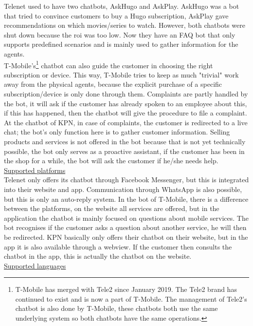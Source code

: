 \break
Telenet used to have two chatbots, AskHugo and AskPlay. AskHugo was a bot that tried to convince customers to buy a Hugo subscription, AskPlay gave recommendations on which movies/series to watch. However, both chatbots were shut down because the \acrshort{roi} was too low. Now they have an FAQ bot that only supports predefined scenarios and is mainly used to gather information for the agents.\\
\break
T-Mobile's\footnote{T-Mobile has merged with Tele2 since January 2019. The Tele2 brand has continued to exist and is now a part of T-Mobile. The management of Tele2's chatbot is also done by T-Mobile, these chatbots both use the same underlying system so both chatbots have the same operations.} chatbot can also guide the customer in choosing the right subscription or device. This way, T-Mobile tries to keep as much "trivial" work away from the physical agents, because the explicit purchase of a specific subscription/device is only done through them. Complaints are partly handled by the bot, it will ask if the customer has already spoken to an employee about this, if this has happened, then the chatbot will give the procedure to file a complaint.\\
\break
At the chatbot of KPN, in case of complaints, the customer is redirected to a live chat; the bot's only function here is to gather customer information. Selling products and services is not offered in the bot because that is not yet technically possible, the bot only serves as a proactive assistant, if the customer has been in the shop for a while, the bot will ask the customer if he/she needs help.\\
\break
\ul{Supported platforms}\\
Telenet only offers its chatbot through Facebook Messenger, but this is integrated into their website and app. Communication through WhatsApp is also possible, but this is only an auto-reply system. In the bot of T-Mobile, there is a difference between the platforms, on the website all services are offered, but in the application the chatbot is mainly focused on questions about mobile services. The bot recognises if the customer asks a question about another service, he will then be redirected. KPN basically only offers their chatbot on their website, but in the app it is also available through a webview. If the customer then consults the chatbot in the app, this is actually the chatbot on the website.\\
\break
\ul{Supported languages}\\
